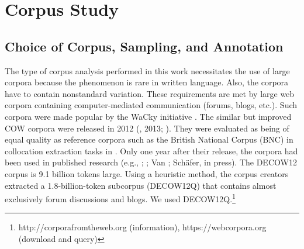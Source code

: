 \section{Corpus Study}



\subsection{Choice of Corpus, Sampling, and Annotation}



The type of corpus analysis performed in this work necessitates the use of large corpora because the phenomenon is rare in written language. Also, the corpora have to contain nonstandard variation. These re\-quirements are met by large web corpora containing computer-medi\-ated communication (forums, blogs, etc.). Such corpora were made popular by the WaCky initiative \citep{BaroniEtAl2009}. The similar but improved COW corpora were released in 2012 (\citealt{SchäferBildhauer2012}, 2013; \citealt{SchäferEtAl2013}). They were evaluated as being of equal quality as reference corpora such as the British National Corpus (BNC) in collocation extraction tasks in \citet{BiemannEtAl2013}. Only one year after their release, the corpora had been used in published research (e.g., \citealt{Müller2014}; \citealt{SchäferSayatz2014}; Van \citealt{GoethemHiligsmann2014}; Schäfer, in press). The DECOW12 corpus is 9.1 billion tokens large. Using a heuristic method, the corpus creators extracted a 1.8-billion-to\-ken subcorpus (DECOW12Q) that contains almost exclusively forum discussions and blogs. We used DECOW12Q.\footnote{http://corporafromtheweb.org (information), https://webcorpora.org (download and query)}



